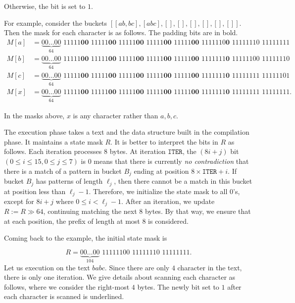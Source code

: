 Otherwise, the bit is set to $1$.

For example, consider the buckets $[[ab,bc],[abc],[],[],[],[],[],[]]$. Then the mask for each character is as follows. The padding bits are in bold.
\begin{align*}
  M[a] & = \underbrace{00\ldots00}_{64}\,\, 11111\textbf{00}\,\,11111\textbf{00}\,\,11111\textbf{00}\,\,11111\textbf{00}\,\,11111\textbf{00}\,\,1111110\textbf{0} \,\, 11111110\,\,11111111  \\
  M[b] & = \underbrace{00\ldots00}_{64}\,\, 11111\textbf{00}\,\,11111\textbf{00}\,\,11111\textbf{00}\,\,11111\textbf{00}\,\,11111\textbf{00}\,\,1111111\textbf{0} \,\, 11111100\,\,11111110  \\
  M[c] & = \underbrace{00\ldots00}_{64}\,\, 11111\textbf{00}\,\,11111\textbf{00}\,\,11111\textbf{00}\,\,11111\textbf{00}\,\,11111\textbf{00}\,\,1111111\textbf{0} \,\, 11111111\,\,11111101  \\
  M[x] & = \underbrace{00\ldots00}_{64}\,\, 11111\textbf{00}\,\,11111\textbf{00}\,\,11111\textbf{00}\,\,11111\textbf{00}\,\,11111\textbf{00}\,\,1111111\textbf{0} \,\, 11111111\,\,11111111.
\end{align*}

In the masks above, $x$ is any character rather than $a,b,c$.

The execution phase takes a text and the data structure built in the compilation phase. It maintains a state mask $R$. It is better to interpret the bits in $R$ as follows. Each iteration processes $8$ bytes. At iteration $\texttt{ITER}$, the $(8i+j)$ bit $(0\le i\le 15, 0 \le j \le 7)$ is $0$ means that there is currently \textit{no contradiction} that there is a match of a pattern in bucket $B_j$ ending at position $8\times\texttt{ITER}+i$. If bucket $B_j$ has patterns of length $\ell_j$, then there cannot be a match in this bucket at position less than $\ell_j-1$. Therefore, we initialize the state mask to all $0$'s, except for $8i+j$ where $0\le i< \ell_j-1$. After an iteration, we update $R:= R \gg 64$, continuing matching the next $8$ bytes. By that way, we ensure that at each position, the prefix of length at most $8$ is considered.

Coming back to the example, the initial state mask is

$$R= \underbrace{00\ldots00}_{104} \,\, 11111100\,\,11111110\,\,11111111.$$
Let us execution on the text $babc$. Since there are only $4$ character in the text, there is only one iteration. We give details about scanning each character as follows, where we consider the right-most $4$ bytes. The newly bit set to $1$ after each character is scanned is underlined.

